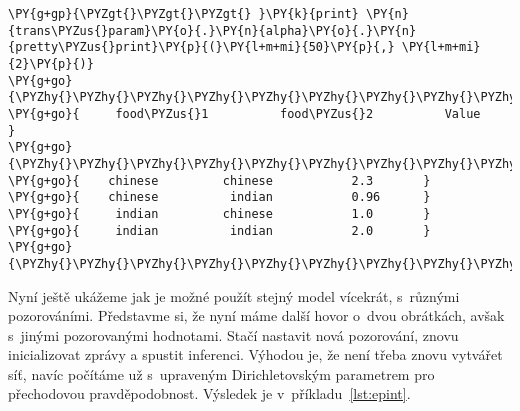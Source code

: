 \begin{example}
\begin{Verbatim}[commandchars=\\\{\}]
\PY{g+gp}{\PYZgt{}\PYZgt{}\PYZgt{} }\PY{k}{print} \PY{n}{trans\PYZus{}param}\PY{o}{.}\PY{n}{alpha}\PY{o}{.}\PY{n}{pretty\PYZus{}print}\PY{p}{(}\PY{l+m+mi}{50}\PY{p}{,} \PY{l+m+mi}{2}\PY{p}{)}
\PY{g+go}{\PYZhy{}\PYZhy{}\PYZhy{}\PYZhy{}\PYZhy{}\PYZhy{}\PYZhy{}\PYZhy{}\PYZhy{}\PYZhy{}\PYZhy{}\PYZhy{}\PYZhy{}\PYZhy{}\PYZhy{}\PYZhy{}\PYZhy{}\PYZhy{}\PYZhy{}\PYZhy{}\PYZhy{}\PYZhy{}\PYZhy{}\PYZhy{}\PYZhy{}\PYZhy{}\PYZhy{}\PYZhy{}\PYZhy{}\PYZhy{}\PYZhy{}\PYZhy{}\PYZhy{}\PYZhy{}\PYZhy{}\PYZhy{}\PYZhy{}\PYZhy{}\PYZhy{}\PYZhy{}\PYZhy{}\PYZhy{}\PYZhy{}\PYZhy{}\PYZhy{}\PYZhy{}\PYZhy{}\PYZhy{}\PYZhy{}\PYZhy{}}
\PY{g+go}{     food\PYZus{}1          food\PYZus{}2          Value      }
\PY{g+go}{\PYZhy{}\PYZhy{}\PYZhy{}\PYZhy{}\PYZhy{}\PYZhy{}\PYZhy{}\PYZhy{}\PYZhy{}\PYZhy{}\PYZhy{}\PYZhy{}\PYZhy{}\PYZhy{}\PYZhy{}\PYZhy{}\PYZhy{}\PYZhy{}\PYZhy{}\PYZhy{}\PYZhy{}\PYZhy{}\PYZhy{}\PYZhy{}\PYZhy{}\PYZhy{}\PYZhy{}\PYZhy{}\PYZhy{}\PYZhy{}\PYZhy{}\PYZhy{}\PYZhy{}\PYZhy{}\PYZhy{}\PYZhy{}\PYZhy{}\PYZhy{}\PYZhy{}\PYZhy{}\PYZhy{}\PYZhy{}\PYZhy{}\PYZhy{}\PYZhy{}\PYZhy{}\PYZhy{}\PYZhy{}\PYZhy{}\PYZhy{}}
\PY{g+go}{    chinese         chinese           2.3       }
\PY{g+go}{    chinese          indian           0.96      }
\PY{g+go}{     indian         chinese           1.0       }
\PY{g+go}{     indian          indian           2.0       }
\PY{g+go}{\PYZhy{}\PYZhy{}\PYZhy{}\PYZhy{}\PYZhy{}\PYZhy{}\PYZhy{}\PYZhy{}\PYZhy{}\PYZhy{}\PYZhy{}\PYZhy{}\PYZhy{}\PYZhy{}\PYZhy{}\PYZhy{}\PYZhy{}\PYZhy{}\PYZhy{}\PYZhy{}\PYZhy{}\PYZhy{}\PYZhy{}\PYZhy{}\PYZhy{}\PYZhy{}\PYZhy{}\PYZhy{}\PYZhy{}\PYZhy{}\PYZhy{}\PYZhy{}\PYZhy{}\PYZhy{}\PYZhy{}\PYZhy{}\PYZhy{}\PYZhy{}\PYZhy{}\PYZhy{}\PYZhy{}\PYZhy{}\PYZhy{}\PYZhy{}\PYZhy{}\PYZhy{}\PYZhy{}\PYZhy{}\PYZhy{}\PYZhy{}}
\end{Verbatim}
\end{example}

Nyní ještě ukážeme jak je možné použít stejný model vícekrát, s~různými pozorováními.
Představme si, že nyní máme další hovor o~dvou obrátkách, avšak s~jinými pozorovanými hodnotami.
Stačí nastavit nová pozorování, znovu inicializovat zprávy a spustit inferenci.
Výhodou je, že není třeba znovu vytvářet síť, navíc počítáme už s~upraveným Dirichletovským parametrem pro přechodovou pravděpodobnost.
Výsledek je v~příkladu~\ref{lst:epint}.

